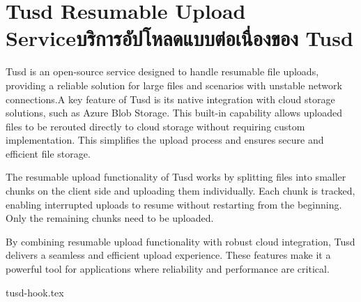 \section{\ifenglish Tusd Resumable Upload Service\else บริการอัปโหลดแบบต่อเนื่องของ Tusd\fi}
Tusd is an open-source service designed to handle resumable file uploads, providing a reliable solution for large files and scenarios with unstable network connections.\enskip A key feature of Tusd is its native integration with cloud storage solutions, such as Azure Blob Storage. This built-in capability allows uploaded files to be rerouted directly to cloud storage without requiring custom implementation. This simplifies the upload process and ensures secure and efficient file storage.

The resumable upload functionality of Tusd works by splitting files into smaller chunks on the client side and uploading them individually. Each chunk is tracked, enabling interrupted uploads to resume without restarting from the beginning. Only the remaining chunks need to be uploaded.

By combining resumable upload functionality with robust cloud integration, Tusd delivers a seamless and efficient upload experience. These features make it a powerful tool for applications where reliability and performance are critical.

\newcommand{\dir}{chapters/approach/tusd}
{tusd-hook.tex}